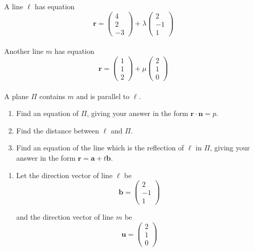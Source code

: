 \documentclass[leqno]{article}
\begin{document}
\begin{enumerate}[
  label=\textbf{\arabic*.},
  leftmargin=*,
  topsep=0pt,
  partopsep=0pt,
  parsep=0pt
]
A line $\ell$ has equation
\[
\mathbf{r}=\begin{pmatrix}4\\2\\-3\end{pmatrix}+\lambda\begin{pmatrix}2\\-1\\1\end{pmatrix}
\] \\
Another line $m$ has equation
\[
\mathbf{r}=\begin{pmatrix}1\\1\\2\end{pmatrix}+\mu\begin{pmatrix}2\\1\\0\end{pmatrix}
\] \\
A plane $\Pi$ contains $m$ and is parallel to $\ell$. \\
\begin{enumerate}[label=\textbf{(\roman*)}]
  \item Find an equation of $\Pi$, giving your answer in the form $\mathbf{r}\cdot\mathbf{n}=p$.  \\
  \item Find the distance between $\ell$ and $\Pi$.  \\
  \item Find an equation of the line which is the reflection of $\ell$ in $\Pi$, giving your answer in the form $\mathbf{r}=\mathbf{a}+t\mathbf{b}$.  \\
\end{enumerate}

\vspace*{10pt}

\begin{djsSolution}
\begin{enumerate}[label=\textbf{(\roman*)}]
  \item Let the direction vector of line \(\ell\) be
\[
\mathbf b=\begin{pmatrix}2\\-1\\1\end{pmatrix}
\]

and the direction vector of line \(m\) be
\[
\mathbf u=\begin{pmatrix}2\\1\\0\end{pmatrix}
\]


\end{enumerate}
\end{djsSolution}
\end{enumerate}
\end{document}
